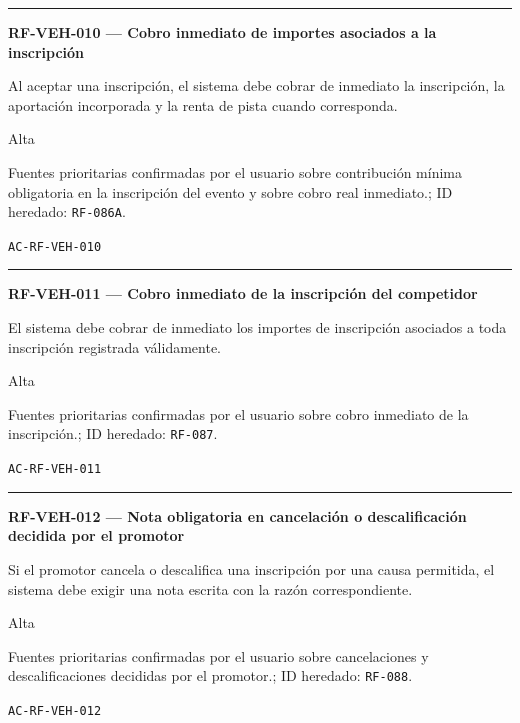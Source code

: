 \documentclass[10pt,letterpaper]{article}
\begin{document}
\vspace{0.25em}\hrule\vspace{0.65em}
\noindent\textbf{RF-VEH-010 --- Cobro inmediato de importes asociados a la inscripción}\par
\begin{description}[style=nextline,leftmargin=3.15cm,labelwidth=2.8cm,font=\normalfont\bfseries]
\item[Obligación] Al aceptar una inscripción, el sistema debe cobrar de inmediato la inscripción, la aportación incorporada y la renta de pista cuando corresponda.
\item[Prioridad] Alta
\item[Procedencia] Fuentes prioritarias confirmadas por el usuario sobre contribución mínima obligatoria en la inscripción del evento y sobre cobro real inmediato.; ID heredado: \texttt{RF-086A}.
\item[Verificación] \texttt{AC-RF-VEH-010}
\end{description}
\vspace{0.25em}\hrule\vspace{0.65em}
\noindent\textbf{RF-VEH-011 --- Cobro inmediato de la inscripción del competidor}\par
\begin{description}[style=nextline,leftmargin=3.15cm,labelwidth=2.8cm,font=\normalfont\bfseries]
\item[Obligación] El sistema debe cobrar de inmediato los importes de inscripción asociados a toda inscripción registrada válidamente.
\item[Prioridad] Alta
\item[Procedencia] Fuentes prioritarias confirmadas por el usuario sobre cobro inmediato de la inscripción.; ID heredado: \texttt{RF-087}.
\item[Verificación] \texttt{AC-RF-VEH-011}
\end{description}
\vspace{0.25em}\hrule\vspace{0.65em}
\noindent\textbf{RF-VEH-012 --- Nota obligatoria en cancelación o descalificación decidida por el promotor}\par
\begin{description}[style=nextline,leftmargin=3.15cm,labelwidth=2.8cm,font=\normalfont\bfseries]
\item[Obligación] Si el promotor cancela o descalifica una inscripción por una causa permitida, el sistema debe exigir una nota escrita con la razón correspondiente.
\item[Prioridad] Alta
\item[Procedencia] Fuentes prioritarias confirmadas por el usuario sobre cancelaciones y descalificaciones decididas por el promotor.; ID heredado: \texttt{RF-088}.
\item[Verificación] \texttt{AC-RF-VEH-012}
\end{description}
\end{document}

